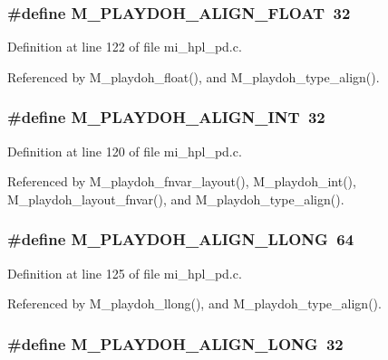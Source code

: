 \subsubsection{\setlength{\rightskip}{0pt plus 5cm}\#define M\_\-PLAYDOH\_\-ALIGN\_\-FLOAT~32}\label{mi__hpl__pd_8c_2569f26e77dfe112483c623fdcb5f96b}




Definition at line 122 of file mi\_\-hpl\_\-pd.c.

Referenced by M\_\-playdoh\_\-float(), and M\_\-playdoh\_\-type\_\-align().
\subsubsection{\setlength{\rightskip}{0pt plus 5cm}\#define M\_\-PLAYDOH\_\-ALIGN\_\-INT~32}\label{mi__hpl__pd_8c_174012a1e7493c2c0ce04b47fa29acdc}




Definition at line 120 of file mi\_\-hpl\_\-pd.c.

Referenced by M\_\-playdoh\_\-fnvar\_\-layout(), M\_\-playdoh\_\-int(), M\_\-playdoh\_\-layout\_\-fnvar(), and M\_\-playdoh\_\-type\_\-align().
\subsubsection{\setlength{\rightskip}{0pt plus 5cm}\#define M\_\-PLAYDOH\_\-ALIGN\_\-LLONG~64}\label{mi__hpl__pd_8c_1e78bc999a25285c2761d59acd6c5d41}




Definition at line 125 of file mi\_\-hpl\_\-pd.c.

Referenced by M\_\-playdoh\_\-llong(), and M\_\-playdoh\_\-type\_\-align().
\subsubsection{\setlength{\rightskip}{0pt plus 5cm}\#define M\_\-PLAYDOH\_\-ALIGN\_\-LONG~32}\label{mi__hpl__pd_8c_9c5fdfa322744c39828a7c96054ce308}




